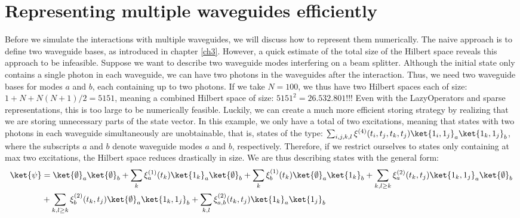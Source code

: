 \section{Representing multiple waveguides efficiently }

Before we simulate the interactions with multiple waveguides, we will discuss how to represent them numerically. The naive approach is to define two waveguide bases, as introduced in chapter \ref{ch3}. However, a quick estimate of the total size of the Hilbert space reveals this approach to be infeasible. Suppose we want to describe two waveguide modes interfering on a beam splitter. Although the initial state only contains a single photon in each waveguide, we can have two photons in the waveguides after the interaction. Thus, we need two waveguide bases for modes $a$ and $b$, each containing up to two photons. If we take $N=100$, we thus have two Hilbert spaces each of size: $1+N+N(N+1)/2 = 5151$, meaning a combined Hilbert space of size: $5151^2 = 26.532.801$!!! Even with the LazyOperators and sparse representations, this is too large to be numerically feasible. Luckily, we can create a much more efficient storing strategy by realizing that we are storing unnecessary parts of the state vector. In this example, we only have a total of two excitations, meaning that states with two photons in each waveguide simultaneously are unobtainable, that is, states of the type: $\sum_{i,j,k,l}\xi^{(4)}(t_i,t_j,t_k,t_j) \ket{1_i,1_j}_a\ket{1_k,1_j}_b$, where the subscripts $a$ and $b$ denote waveguide modes $a$ and $b$, respectively. Therefore, if we restrict ourselves to states only containing at max two excitations, the Hilbert space reduces drastically in size. We are thus describing states with the general form:
\begin{align}
    \ket{\psi} &= \ket{\emptyset}_a\ket{\emptyset}_b + \sum_k \xi_a^{(1)}(t_k) \ket{1_k}_a\ket{\emptyset}_b + \sum_k \xi_b^{(1)}(t_k) \ket{\emptyset}_a\ket{1_k}_b + \sum_{k,l \geq k}\xi_a^{(2)}(t_k,t_j) \ket{1_k,1_j}_a \ket{\emptyset}_b \\ 
    &+ \sum_{k,l \geq k}\xi_b^{(2)}(t_k,t_j) \ket{\emptyset}_a \ket{1_k,1_j}_b+ \sum_{k,l}\xi_{a,b}^{(2)}(t_k,t_j) \ket{1_k}_a \ket{1_j}_b
\end{align}

